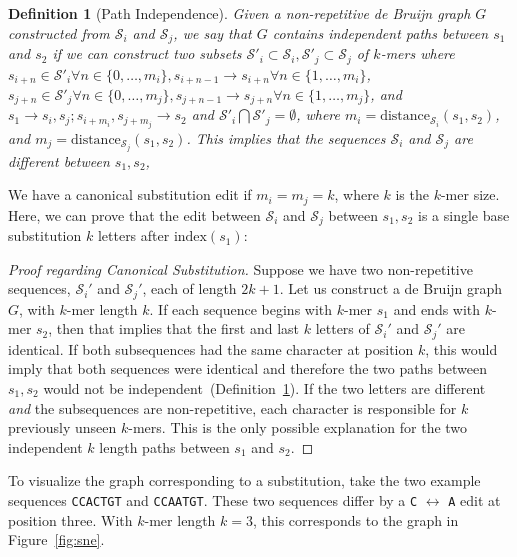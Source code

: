 \documentclass{bioinfo}
\newtheorem{defn}{Definition}
\begin{document}
\begin{methods}
\begin{defn}[Path Independence]
\label{defn:path-independence}
Given a non-repetitive de Bruijn graph $G$ constructed from $\mathcal{S}_i$ and $\mathcal{S}_j$, we say
that $G$ contains independent paths between $s_1$ and $s_2$ if we can construct two subsets
$\mathcal{S}'_i \subset \mathcal{S}_i, \mathcal{S}'_j \subset \mathcal{S}_j$ of $k$-mers where $s_{i + n}
\in \mathcal{S}'_i \forall n \in \{0, \dots, m_i\}, s_{i + n - 1} \rightarrow s_{i + n} \forall n \in \{1, \dots, m_i\}$,
$s_{j + n} \in \mathcal{S}'_j \forall n \in \{0, \dots, m_j\}, s_{j + n - 1} \rightarrow s_{j + n} \forall n \in \{1,
\dots, m_j\}$, and $s_1 \rightarrow s_i, s_j; s_{i + m_i}, s_{j + m_j} \rightarrow s_2$ and $\mathcal{S}'_i
\bigcap \mathcal{S}'_j = \emptyset$, where $m_i = \text{distance}_{\mathcal{S}_i}(s_1, s_2)$, and $m_j =
\text{distance}_{\mathcal{S}_j}(s_1, s_2)$. This implies that the sequences $\mathcal{S}_i$ and
$\mathcal{S}_j$ are different between $s_1, s_2$,
\end{defn}

We have a canonical substitution edit if $m_i = m_j = k$, where $k$ is the $k$-mer size. Here, we can
prove that the edit between $\mathcal{S}_i$ and $\mathcal{S}_j$ between $s_1, s_2$ is a single base
substitution $k$ letters after $\text{index}(s_1)$:

\begin{proof}[Proof regarding Canonical Substitution]
\label{proof:canonical-substitution}
Suppose we have two non-repetitive sequences, $\mathcal{S}_i'$ and $\mathcal{S}_j'$, each of length
$2k + 1$. Let us construct a de Bruijn graph $G$, with $k$-mer length $k$. If each sequence begins with
$k$-mer $s_1$ and ends with $k$-mer $s_2$, then that implies that the first and last $k$ letters of
$\mathcal{S}_i'$ and $\mathcal{S}_j'$ are identical. If both subsequences had the same character at
position $k$, this would imply that both sequences were identical and therefore the two paths between
$s_1, s_2$ would not be independent~(Definition~\ref{defn:path-independence}). If the two letters are
different \emph{and} the subsequences are non-repetitive, each character is responsible for $k$
previously unseen $k$-mers. This is the only possible explanation for the two independent $k$ length
paths between $s_1$ and $s_2$.
\end{proof}

To visualize the graph corresponding to a substitution, take the two example sequences \texttt{CCACTGT}
and \texttt{CCAATGT}. These two sequences differ by a \texttt{C} $\leftrightarrow$ \texttt{A} edit at
position three. With $k$-mer length $k = 3$, this corresponds to the graph in Figure~\ref{fig:sne}.


\end{methods}
\end{document}
